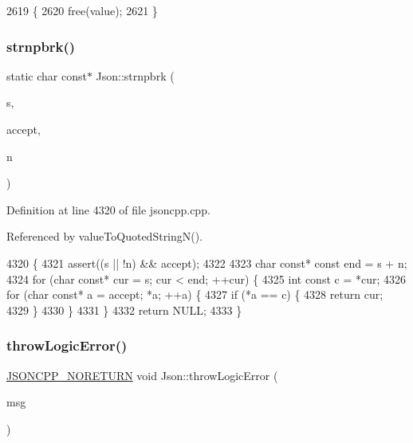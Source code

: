 \begin{DoxyCode}
2619                                                              \{
2620   free(value);
2621 \}
\end{DoxyCode}
\mbox{\label{namespace_json_a7492156d0c7d2dd2f672acacfb240320}} 
\subsubsection{\texorpdfstring{strnpbrk()}{strnpbrk()}}
{\footnotesize\ttfamily static char const$\ast$ Json\+::strnpbrk (\begin{DoxyParamCaption}\item[{char const $\ast$}]{s,  }\item[{char const $\ast$}]{accept,  }\item[{size\+\_\+t}]{n }\end{DoxyParamCaption})\hspace{0.3cm}{\ttfamily [static]}}



Definition at line 4320 of file jsoncpp.\+cpp.



Referenced by value\+To\+Quoted\+String\+N().


\begin{DoxyCode}
4320                                                                          \{
4321   assert((s || !n) && accept);
4322 
4323   \textcolor{keywordtype}{char} \textcolor{keyword}{const}* \textcolor{keyword}{const} end = s + n;
4324   \textcolor{keywordflow}{for} (\textcolor{keywordtype}{char} \textcolor{keyword}{const}* cur = s; cur < end; ++cur) \{
4325     \textcolor{keywordtype}{int} \textcolor{keyword}{const} c = *cur;
4326     \textcolor{keywordflow}{for} (\textcolor{keywordtype}{char} \textcolor{keyword}{const}* a = accept; *a; ++a) \{
4327       \textcolor{keywordflow}{if} (*a == c) \{
4328         \textcolor{keywordflow}{return} cur;
4329       \}
4330     \}
4331   \}
4332   \textcolor{keywordflow}{return} NULL;
4333 \}
\end{DoxyCode}
\mbox{\label{namespace_json_a27790f21f17922fac81e7cd72a5659a5}} 
\subsubsection{\texorpdfstring{throw\+Logic\+Error()}{throwLogicError()}}
{\footnotesize\ttfamily \hyperlink{json_8h_a78c5ba441d8b48f24a5095b97f01f282}{J\+S\+O\+N\+C\+P\+P\+\_\+\+N\+O\+R\+E\+T\+U\+RN} void Json\+::throw\+Logic\+Error (\begin{DoxyParamCaption}\item[{\hyperlink{json_8h_a1e723f95759de062585bc4a8fd3fa4be}{J\+S\+O\+N\+C\+P\+P\+\_\+\+S\+T\+R\+I\+NG} const \&}]{msg }\end{DoxyParamCaption})}



